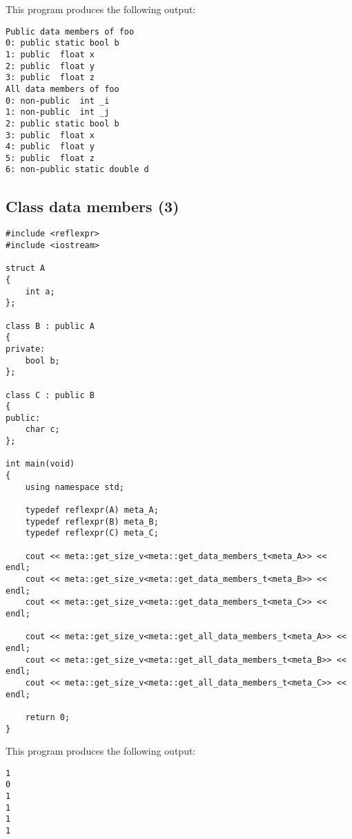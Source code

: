 This program produces the following output:

\begin{verbatim}
Public data members of foo
0: public static bool b
1: public  float x
2: public  float y
3: public  float z
All data members of foo
0: non-public  int _i
1: non-public  int _j
2: public static bool b
3: public  float x
4: public  float y
5: public  float z
6: non-public static double d
\end{verbatim}


\subsection{Class data members (3)}

\begin{verbatim}
#include <reflexpr>
#include <iostream>

struct A
{
	int a;
};

class B : public A
{
private:
	bool b;
};

class C : public B
{
public:
	char c;
};

int main(void)
{
	using namespace std;

	typedef reflexpr(A) meta_A;
	typedef reflexpr(B) meta_B;
	typedef reflexpr(C) meta_C;

	cout << meta::get_size_v<meta::get_data_members_t<meta_A>> << endl;
	cout << meta::get_size_v<meta::get_data_members_t<meta_B>> << endl;
	cout << meta::get_size_v<meta::get_data_members_t<meta_C>> << endl;

	cout << meta::get_size_v<meta::get_all_data_members_t<meta_A>> << endl;
	cout << meta::get_size_v<meta::get_all_data_members_t<meta_B>> << endl;
	cout << meta::get_size_v<meta::get_all_data_members_t<meta_C>> << endl;

	return 0;
}
\end{verbatim}

This program produces the following output:

\begin{verbatim}
1
0
1
1
1
1
\end{verbatim}

